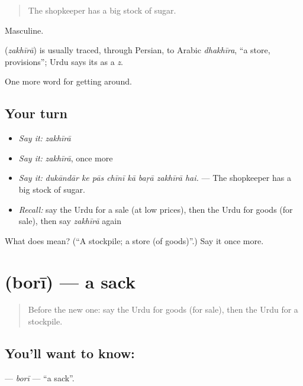 \begin{quote}
The shopkeeper has a big stock of sugar.
\end{quote}

Masculine.

\begin{cousinweb}
\textbf{} (\emph{zakhīrā}) is usually traced, through Persian, to Arabic \emph{dhakhīra}, \textquotedblleft{}a store, provisions\textquotedblright{}; Urdu says its \textbf{} as a \emph{z}.
\end{cousinweb}

\begin{grammarlens}[title={What you've built}]
One more word for getting around.
\end{grammarlens}

\subsection*{Your turn}
\begin{itemize}
\raggedright
  \item \emph{Say it:} \emph{zakhīrā}
  \item \emph{Say it:} \emph{zakhīrā}, once more
  \item \emph{Say it:} \emph{dukāndār ke pās chīnī kā baṛā zakhīrā hai.} — The shopkeeper has a big stock of sugar.
  \item \emph{Recall:} say the Urdu for a sale (at low prices), then the Urdu for goods (for sale), then say \emph{zakhīrā} again
\end{itemize}

\begin{tcolorbox}[breakable,colback=teal!4,colframe=teal!35!black,title={Before you move on}]
What does  mean? (\textquotedblleft{}A stockpile; a store (of goods)\textquotedblright{}.) Say it once more.
\end{tcolorbox}
\section[\texorpdfstring{\ur{بوری} (borī)}{بوری (borī)}]{ (borī) — a sack}

\label{lesson:UR-C424-bori}



\begin{quote}
Before the new one: say the Urdu for goods (for sale), then the Urdu for a stockpile.
\end{quote}

\subsection*{You'll want to know: }
\textbf{} — \emph{borī} — \textquotedblleft{}a sack\textquotedblright{}.

